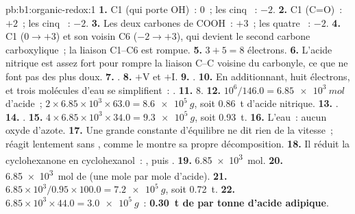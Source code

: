\begin{solution}{pb:b1:organic-redox:1}
\textbf{1.} C1 (qui porte OH)~: 0~; les cinq ~: $-2$.
\textbf{2.} C1 (C=O)~: $+2$~; les cinq ~: $-2$.
\textbf{3.} Les deux carbones de COOH~: $+3$~; les quatre ~: $-2$.
\textbf{4.} C1 ($0 \to +3$) et son voisin C6 ($-2 \to +3$), qui devient
le second carbone carboxylique~; la liaison C1--C6 est rompue.
\textbf{5.} $3 + 5 = 8$ électrons.
\textbf{6.} L'acide nitrique est assez fort pour rompre la liaison C--C
voisine du carbonyle, ce que ne font pas des  plus doux.
\textbf{7.} .
\textbf{8.} $+$V et $+$I.
\textbf{9.} .
\textbf{10.} En additionnant, huit électrons,  et trois
molécules d'eau se simplifient~:
.
\textbf{11.} 8.
\textbf{12.} $10^6/146.0 = \qty{6.85e3}{mol}$ d'acide~; $2 \times 6.85 \times
10^3 \times 63.0 = \qty{8.6e5}{g}$, soit \qty{0.86}{t} d'acide nitrique.
\textbf{13.} .
\textbf{14.} .
\textbf{15.} $4 \times 6.85 \times 10^3 \times 34.0 = \qty{9.3e5}{g}$,
soit \qty{0.93}{t}.
\textbf{16.} L'eau~: aucun oxyde d'azote.
\textbf{17.} Une grande constante d'équilibre ne dit rien de la
vitesse~;  réagit lentement sans , comme le montre sa
propre décomposition.
\textbf{18.} Il réduit la cyclohexanone en cyclohexanol~:
, puis
.
\textbf{19.} \qty{6.85e3}{mol}.
\textbf{20.} \qty{6.85e3}{mol} de  (une mole par mole d'acide).
\textbf{21.} $6.85 \times 10^3/0.95 \times 100.0 = \qty{7.2e5}{g}$, soit \qty{0.72}{t}.
\textbf{22.} $6.85 \times 10^3 \times 44.0 = \qty{3.0e5}{g}$~: \textbf{\qty{0.30}{t}
de  par tonne d'acide adipique}.
\end{solution}
